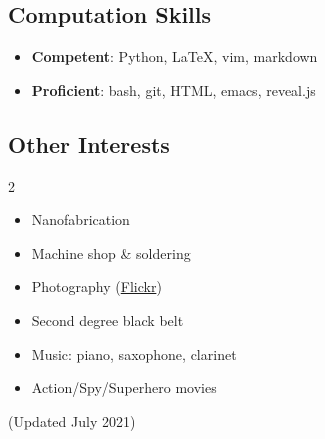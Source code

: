 \documentclass[12pt]{article}
\begin{document}
\subsection*{\sf Computation Skills}

\begin{itemize}
\item[] \textbf{Competent}: Python, \LaTeX, vim, markdown
\item[] \textbf{Proficient}: bash, git, HTML, emacs, reveal.js
\end{itemize}

\subsection*{\sf Other Interests}
\begin{multicols}{2}
\begin{itemize}
\item[] Nanofabrication
\item[] Machine shop \& soldering
\item[] Photography (\href{https://www.flickr.com/photos/155448890@N05/}{Flickr})
\item[] Second degree black belt
\item[] Music: piano, saxophone, clarinet
\item[] Action/Spy/Superhero movies
\end{itemize}
\end{multicols}

\vfill
\flushright (Updated July 2021)
\end{document}
